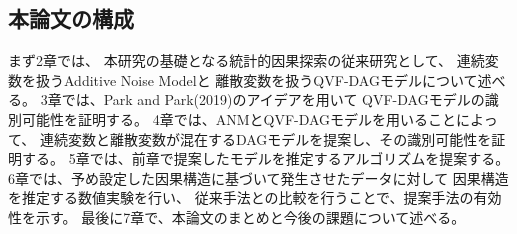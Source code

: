 
\subsection{本論文の構成}

まず2章では、
本研究の基礎となる統計的因果探索の従来研究として、
連続変数を扱うAdditive Noise Modelと
離散変数を扱うQVF-DAGモデルについて述べる。
3章では、Park and Park(2019)\cite{Park2019-qy}のアイデアを用いて
QVF-DAGモデルの識別可能性を証明する。
4章では、ANMとQVF-DAGモデルを用いることによって、
連続変数と離散変数が混在するDAGモデルを提案し、その識別可能性を証明する。
5章では、前章で提案したモデルを推定するアルゴリズムを提案する。
6章では、予め設定した因果構造に基づいて発生させたデータに対して
因果構造を推定する数値実験を行い、
従来手法との比較を行うことで、提案手法の有効性を示す。
最後に7章で、本論文のまとめと今後の課題について述べる。
